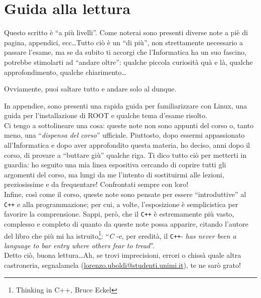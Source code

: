 \chapter{Guida alla lettura}
Questo scritto  è ``a più livelli''. Come noterai sono presenti diverse note a piè di pagina, appendici, ecc\ldots Tutto ciò è un ``di più'', non strettamente necessario a passare l'esame, ma se da subito ti accorgi che l'Informatica ha un suo fascino, potrebbe stimolarti ad ``andare oltre'': qualche piccola curiosità quà e là, qualche approfondimento, qualche chiarimento\ldots

Ovviamente, puoi saltare tutto e andare solo al dunque. 

In appendice, sono presenti una rapida guida per familiarizzare con Linux, una guida per l'installazione di ROOT e qualche tema d'esame risolto.\\


Ci tengo a sottolineare una cosa: queste note non sono appunti del corso o, tanto meno, una ``\emph{dispensa del corso}'' ufficiale. Piuttosto, dopo essermi appassionato all'Informatica e dopo aver approfondito questa materia, ho deciso, anni dopo il corso, di provare a ``buttare giù'' qualche riga. Ti dico tutto ciò per metterti in guardia: ho seguito una mia linea espositiva cercando di coprire tutti gli argomenti del corso, ma lungi da me l'intento di sostituirmi alle lezioni, preziosissime e da frequentare! Confrontati sempre con loro!\\

Infine, così come il corso, queste note sono pensate per essere ``introduttive'' al \verb|C++| e alla programmazione; per cui, a volte, l'esposizione è semplicistica per favorire la comprensione. Sappi, però, che il \verb|C++| è estremamente più vasto, complesso e completo di quanto da queste note possa apparire, citando l'autore del libro che più mi ha istruito\footnote{Thinking in C++, Bruce Eckel}: ``\emph{C} -e, per eredità, il \verb|C++|- \emph{ has never been a language to bar entry where others fear to tread}''. \\

Detto ciò, buona lettura\ldots Ah, se trovi imprecisioni, errori o chissà quale altra castroneria, segnalamela (\href{mailto:lorenzo.uboldi@studenti.unimi.it}{\ttfamily lorenzo.uboldi@studenti.unimi.it}), te ne sarò grato!